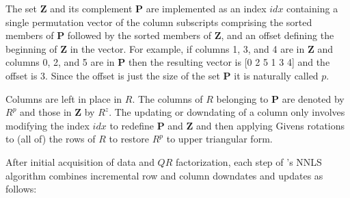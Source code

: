 The set \textbf{Z} and its complement \textbf{P} are implemented as an index $idx$
containing a single permutation vector of the column subscripts comprising
the sorted members of \textbf{P} followed by the sorted members of \textbf{Z},
and an offset defining the beginning of \textbf{Z} in the vector.
For example, if columns 1, 3, and 4 are in \textbf{Z} and columns 0, 2, and 5 are in \textbf{P}
then the resulting vector is [0 2 5 1 3 4] and the offset is 3.
Since the offset is just the size of the set \textbf{P} it is naturally called $p$.

Columns are left in place in $R$. The columns of $R$ belonging to \textbf{P} are denoted by $R^p$ and those in \textbf{Z} by $R^z$.
The updating or downdating of a column only involves modifying the index $idx$ to redefine \textbf{P} and \textbf{Z} and then
applying Givens rotations to (all of) the rows of $R$ to restore $R^p$ to upper triangular form.

After initial acquisition of data and $QR$ factorization, each step of \pacora's NNLS algorithm
combines incremental row and column downdates and updates as follows:


